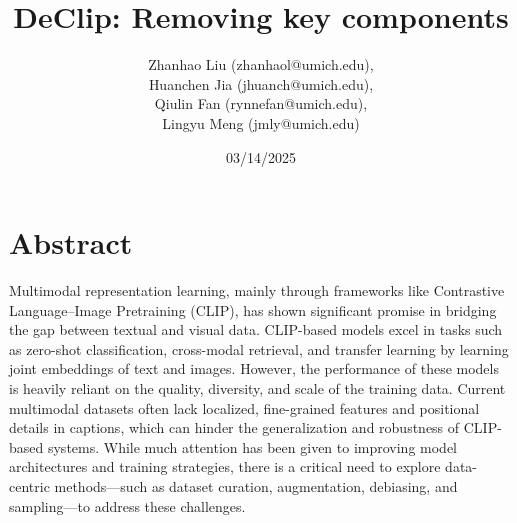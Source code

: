 \documentclass[11pt,letterpaper]{article}
\begin{document}
\title{DeClip: Removing key components }


\author{
Zhanhao Liu (zhanhaol@umich.edu), \\
Huanchen Jia (jhuanch@umich.edu),\\
Qiulin Fan (rynnefan@umich.edu),\\
Lingyu Meng (jmly@umich.edu)\\
}

\date{03/14/2025}


\maketitle

\section{Abstract}
Multimodal representation learning, mainly through frameworks like Contrastive Language–Image Pretraining (CLIP), has shown significant promise in bridging the gap between textual and visual data. CLIP-based models excel in tasks such as zero-shot classification, cross-modal retrieval, and transfer learning by learning joint embeddings of text and images. However, the performance of these models is heavily reliant on the quality, diversity, and scale of the training data. Current multimodal datasets often lack localized, fine-grained features and positional details in captions, which can hinder the generalization and robustness of CLIP-based systems. While much attention has been given to improving model architectures and training strategies, there is a critical need to explore data-centric methods—such as dataset curation, augmentation, debiasing, and sampling—to address these challenges. 
\end{document}
